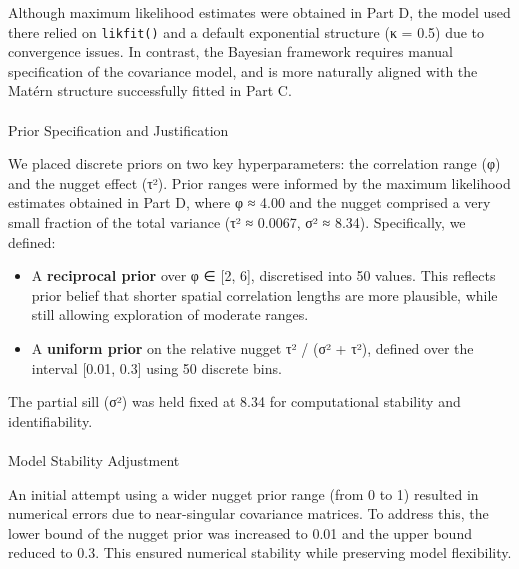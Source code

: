 \documentclass[
  11pt,
]{article}
\makeatletter
\let\oldparagraph\paragraph
\renewcommand{\paragraph}{
    \@ifstar
      \xxxParagraphStar
      \xxxParagraphNoStar
  }
\newcommand{\xxxParagraphStar}[1]{\oldparagraph*{#1}\mbox{}}
\newcommand{\xxxParagraphNoStar}[1]{\oldparagraph{#1}\mbox{}}
\providecommand{\tightlist}{%
  \setlength{\itemsep}{0pt}\setlength{\parskip}{0pt}}\usepackage{longtable,booktabs,array}
\makeatother
\begin{document}
Although maximum likelihood estimates were obtained in Part D, the model
used there relied on \texttt{likfit()} and a default exponential
structure (κ = 0.5) due to convergence issues. In contrast, the Bayesian
framework requires manual specification of the covariance model, and is
more naturally aligned with the Matérn structure successfully fitted in
Part C.

\paragraph{Prior Specification and
Justification}\label{prior-specification-and-justification}

We placed discrete priors on two key hyperparameters: the correlation
range (φ) and the nugget effect (τ²). Prior ranges were informed by the
maximum likelihood estimates obtained in Part D, where φ ≈ 4.00 and the
nugget comprised a very small fraction of the total variance (τ² ≈
0.0067, σ² ≈ 8.34). Specifically, we defined:

\begin{itemize}
\tightlist
\item
  A \textbf{reciprocal prior} over φ ∈ {[}2, 6{]}, discretised into 50
  values. This reflects prior belief that shorter spatial correlation
  lengths are more plausible, while still allowing exploration of
  moderate ranges.
\item
  A \textbf{uniform prior} on the relative nugget τ² / (σ² + τ²),
  defined over the interval {[}0.01, 0.3{]} using 50 discrete bins.
\end{itemize}

The partial sill (σ²) was held fixed at 8.34 for computational stability
and identifiability.

\paragraph{Model Stability Adjustment}\label{model-stability-adjustment}

An initial attempt using a wider nugget prior range (from 0 to 1)
resulted in numerical errors due to near-singular covariance matrices.
To address this, the lower bound of the nugget prior was increased to
0.01 and the upper bound reduced to 0.3. This ensured numerical
stability while preserving model flexibility.
\end{document}
